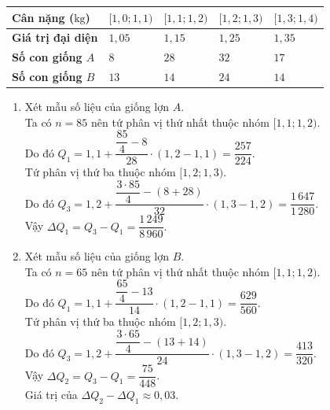 \begin{ex}
{\begin{center}
			\let\PBS=\PreBackslash
			\begin{tabular}{|>{\PBS\centering}m{4cm}|>{\PBS\centering}m{2cm}|>{\PBS\centering}m{2cm}| >{\PBS\centering}m{2cm}|>{\PBS\centering}m{2cm}|}\hline
				\textbf{Cân nặng ($\mathrm{kg}$)} &$[1{,}0;1{,}1)$&$[1{,}1;1{,}2)$&$[1{,}2;1{,}3)$&$[1{,}3;1{,}4)$\\
				\hline
				\textbf{Giá trị đại diện}&$1{,}05$&$1{,}15$&$1{,}25$&$1{,}35$\\
				\hline
				\textbf{Số con giống $A$}&$8$&$28$&$32$&$17$\\
				\hline
				\textbf{Số con giống $B$}&$13$&$14$&$24$&$14$\\
				\hline
			\end{tabular}
		\end{center} 
		\begin{enumerate}[$\bullet$]
			\item Xét mẫu số liệu của giống lợn $A$.\\
			Ta có $n=85$ nên tứ phân vị thứ nhất thuộc nhóm $[1{,}1;1{,}2)$.\\
			Do đó $Q_1=1{,}1+\dfrac{\dfrac{85}{4}-8}{28}\cdot (1{,}2-1{,}1)=\dfrac{257}{224}$.\\
			Tứ phân vị thứ ba thuộc nhóm $[1{,}2;1{,}3)$.\\
			Do đó $Q_3=1{,}2+\dfrac{\dfrac{3\cdot 85}{4}-(8+28)}{32}\cdot (1{,}3-1{,}2)=\dfrac{1\,647}{1\,280}$.\\
			Vậy $\Delta Q_1=Q_3-Q_1=\dfrac{1\,249}{8\,960}.$
			\item Xét mẫu số liệu của giống lợn $B$.\\
			Ta có $n=65$ nên tứ phân vị thứ nhất thuộc nhóm $[1{,}1;1{,}2)$.\\
			Do đó $Q_1=1{,}1+\dfrac{\dfrac{65}{4}-13}{14}\cdot (1{,}2-1{,}1)=\dfrac{629}{560}$.\\
			Tứ phân vị thứ ba thuộc nhóm $[1{,}2;1{,}3)$.\\
			Do đó $Q_3=1{,}2+\dfrac{\dfrac{3\cdot 65}{4}-(13+14)}{24}\cdot (1{,}3-1{,}2)=\dfrac{413}{320}$.\\
			Vậy $\Delta Q_2=Q_3-Q_1=\dfrac{75}{448}$.\\
			Giá trị của $\Delta Q_2-\Delta Q_1\approx 0,03$.
		\end{enumerate}
	}
\end{ex}

